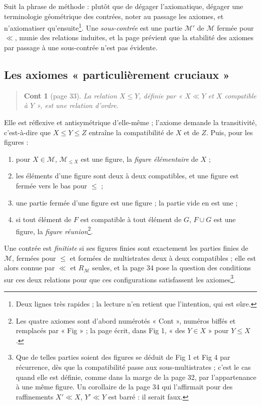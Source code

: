 \documentclass[11pt,a4paper]{article}
\begin{document}
Suit la phrase de méthode : plutôt que de dégager l'axiomatique, dégager une
terminologie géométrique des contrées, noter au passage les axiomes, et
n'axiomatiser qu'ensuite\footnote{Deux lignes très rapides ; la lecture n'en
retient que l'intention, qui est sûre.}. Une \emph{sous-contrée} est une partie
$\mathcal{M}'$ de $\mathcal{M}$ fermée pour $\ll$, munie des relations
induites, et la page prévient que la stabilité des axiomes par passage à une
sous-contrée n'est pas évidente.

\subsection*{Les axiomes « particulièrement cruciaux »}

\begin{quote}
\textbf{Cont 1} (page 33). \emph{La relation $X \leq Y$, définie par « $X \ll
Y$ et $X$ compatible à $Y$ », est une relation d'ordre.}
\end{quote}

Elle est réflexive et antisymétrique d'elle-même ; l'axiome demande
la transitivité, c'est-à-dire que $X \leq Y \leq Z$ entraîne la compatibilité
de $X$ et de $Z$. Puis, pour les figures :
\begin{enumerate}
\item[Fig 1] pour $X \in \mathcal{M}$, $\mathcal{M}_{\leq X}$ est une figure,
la \emph{figure élémentaire} de $X$ ;
\item[Fig 2] les éléments d'une figure sont deux à deux compatibles, et une
figure est fermée vers le bas pour $\leq$ ;
\item[Fig 3] une partie fermée d'une figure est une figure ; la partie vide en
est une ;
\item[Fig 4] si tout élément de $F$ est compatible à tout élément de $G$,
$F \cup G$ est une figure, la \emph{figure réunion}\footnote{Les quatre axiomes
sont d'abord numérotés « Cont », numéros biffés et remplacés par « Fig » ; la
page écrit, dans Fig 1, « des $Y \in X$ » pour $Y \leq X$.}.
\end{enumerate}
Une contrée est \emph{finitiste} si ses figures finies sont exactement les
parties finies de $\mathcal{M}$, fermées pour $\leq$ et formées de multistrates
deux à deux compatibles ; elle est alors connue par $\ll$ et $R_{\mathcal{M}}$
seules, et la page 34 pose la question des conditions sur ces deux relations
pour que ces configurations satisfassent les axiomes\footnote{Que de telles
parties soient des figures se déduit de Fig 1 et Fig 4 par récurrence, dès que
la compatibilité passe aux sous-multistrates ; c'est le cas quand elle est
définie, comme dans la marge de la page 32, par l'appartenance à une même
figure. Un corollaire de la page 34 qui l'affirmait pour des raffinements
$X' \ll X$, $Y' \ll Y$ est barré : il serait faux.}.
\end{document}
